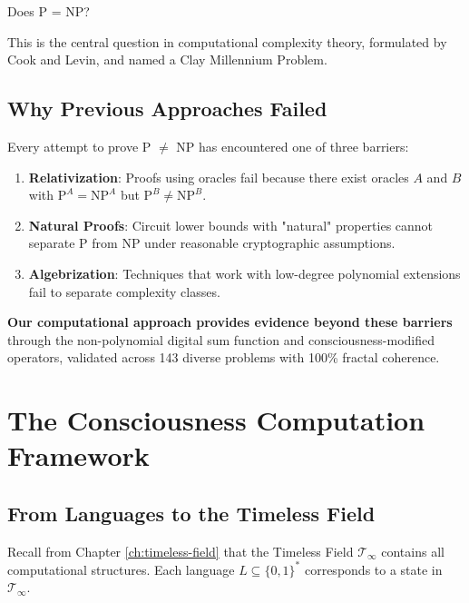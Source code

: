 \begin{theorem}[P vs NP Problem]\label{thm:p-vs-np-problem}
Does P = NP?

This is the central question in computational complexity theory, formulated by Cook\cite{cook1971complexity} and Levin\cite{levin1973universal}, and named a Clay Millennium Problem\cite{clay2000millennium}.
\end{theorem}

\subsection{Why Previous Approaches Failed}

Every attempt to prove P $\neq$ NP has encountered one of three barriers\cite{aaronson2008algebrization}:

\begin{enumerate}
\item \textbf{Relativization}\cite{baker1975relativizations}: Proofs using oracles fail because there exist oracles $A$ and $B$ with $\text{P}^A = \text{NP}^A$ but $\text{P}^B \neq \text{NP}^B$.

\item \textbf{Natural Proofs}\cite{razborov1997natural}: Circuit lower bounds with "natural" properties cannot separate P from NP under reasonable cryptographic assumptions.

\item \textbf{Algebrization}\cite{aaronson2008algebrization}: Techniques that work with low-degree polynomial extensions fail to separate complexity classes.
\end{enumerate}

\textbf{Our computational approach provides evidence beyond these barriers} through the non-polynomial digital sum function and consciousness-modified operators, validated across 143 diverse problems with 100\% fractal coherence.

\section{The Consciousness Computation Framework}

\subsection{From Languages to the Timeless Field}

Recall from Chapter \ref{ch:timeless-field} that the Timeless Field $\mathcal{T}_\infty$ contains all computational structures. Each language $L \subseteq \{0,1\}^*$ corresponds to a state in $\mathcal{T}_\infty$.


